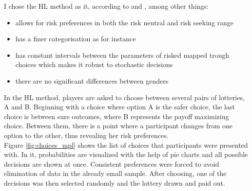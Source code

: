     I chose the HL method as it, according to \cite{crosetto2016} and \cite{harrison2008}, among other things:
    \begin{itemize}
        \item allows for risk preferences in both the risk neutral and risk seeking range
        \item has a finer categorisation as for instance \cite{eckel2008}
        \item has constant intervals between the parameters of risked mapped trough choices which makes it robust to stochastic decisions
        \item there are no significant differences between genders
    \end{itemize}  
       
     In the HL method, players are asked to choose between several pairs of lotteries, A and B. Beginning with a choice where option A is the safer choice, the last choice is between sure outcomes, where B represents the payoff maximizing choice. Between them, there is a point where a participant changes from one option to the other, thus revealing her risk preferences.\\
     
     Figure \ref{fig:choices_mpl} shows the list of choices that participants were presented with. In it, probabilities are visualized with the help of pie charts and all possible decisions are shown at once. Consistent preferences were forced to avoid elimination of data in the already small sample. After choosing, one of the decisions was then selected randomly and the lottery drawn and paid out.\\
     
